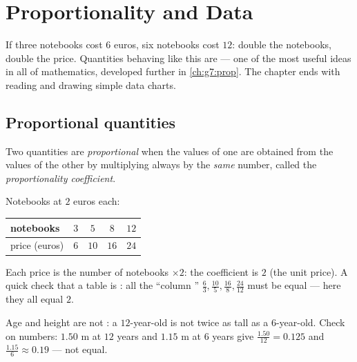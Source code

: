 \chapter{Proportionality and Data}\label{ch:g6:propdata}

If three notebooks cost $6$ euros, six notebooks cost $12$: double the
notebooks, double the price. Quantities behaving like this are
\emph{} --- one of the most useful ideas in all of
mathematics, developed further in \cref{ch:g7:prop}. The chapter ends
with reading and drawing simple data charts.

\section{Proportional quantities}

\begin{definition}[Proportionality]\label{def:g6:propdata:def}
Two quantities are \emph{proportional} when the
values of one are obtained from the values of the other by multiplying
always by the \emph{same} number, called the \emph{proportionality
coefficient}.
\end{definition}

\begin{example}\label{ex:g6:propdata:table}
Notebooks at $2$ euros each:
\begin{center}
\renewcommand{\arraystretch}{1.3}
\begin{tabular}{l|cccc}
notebooks & $3$ & $5$ & $8$ & $12$ \\
\hline
price (euros) & $6$ & $10$ & $16$ & $24$ \\
\end{tabular}
\end{center}
Each price is the number of notebooks $\times 2$: the coefficient is
$2$ (the unit price). A quick check that a table is :
all the ``column '' $\frac{6}{3}, \frac{10}{5}, \frac{16}{8},
\frac{24}{12}$ must be equal --- here they all equal $2$.
\end{example}

\begin{example}\label{ex:g6:propdata:nonexample}
Age and height are not : a $12$-year-old is not twice as
tall as a $6$-year-old. Check on numbers: $1.50$ m at $12$ years and
$1.15$ m at $6$ years give  $\frac{1.50}{12} = 0.125$ and
$\frac{1.15}{6} \approx 0.19$ --- not equal.
\end{example}

